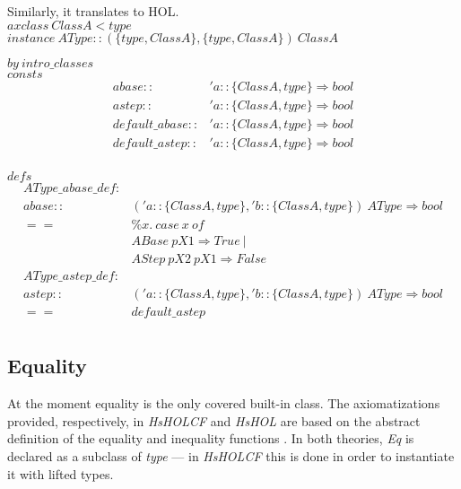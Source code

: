 \documentclass{llncs}
\begin{document}
\noindent Similarly, it translates to HOL.\\

\noindent $axclass \ ClassA < type$\\

\noindent $instance \ AType::(\{type, ClassA\}, \{type, ClassA\}) \ ClassA$ 

$by \ intro\_classes$\\

\noindent $consts$
$$\begin{array}{ll}
abase :: & 'a::\{ClassA, type\} \Rightarrow bool\\
astep :: & 'a::\{ClassA, type\} \Rightarrow bool\\
default\_abase :: & 'a::\{ClassA, type\} \Rightarrow bool\\
default\_astep :: & 'a::\{ClassA, type\} \Rightarrow bool\\
\end{array}$$

\noindent $defs$
$$\begin{array}{rl}
AType\_abase\_def : & \\
   abase :: & ('a::\{ClassA, type\}, 'b::\{ClassA, type\}) \ AType \Rightarrow bool \\
                                   == & \% x. \ case \ x \ of \\
                                   &  ABase \ pX1 \Rightarrow True \ | \\
                                   &  AStep \ pX2 \ pX1 \Rightarrow False \\
AType\_astep\_def : & \\
      astep :: & ('a::\{ClassA, type\}, 'b::\{ClassA, type\}) \ AType \Rightarrow bool \\
      == & default\_astep\\
\end{array}$$

\subsection{Equality}

At the moment equality is the only covered built-in class.  The
axiomatizations provided, respectively, in \emph{HsHOLCF} and
\emph{HsHOL} are based on the abstract definition of the equality and
inequality functions \cite{HaskellRep}. In both theories, \emph{Eq} is
declared as a subclass of \emph{type} --- in \emph{HsHOLCF} this is
done in order to instantiate it with lifted types.\\
\end{document}
